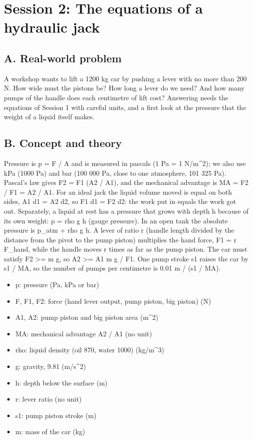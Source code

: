 \documentclass[11pt,a4paper]{article}
\begin{document}
\section{Session 2: The equations of a hydraulic jack}

\subsection*{A. Real-world problem}
A workshop wants to lift a 1200 kg car by pushing a lever with no more than 200 N. How wide must the pistons be? How long a lever do we need? And how many pumps of the handle does each centimetre of lift cost? Answering needs the equations of Session 1 with careful units, and a first look at the pressure that the weight of a liquid itself makes.

\subsection*{B. Concept and theory}
Pressure is p = F / A and is measured in pascals (1 Pa = 1 N/m\textasciicircum{}2); we also use kPa (1000 Pa) and bar (100 000 Pa, close to one atmosphere, 101 325 Pa). Pascal's law gives F2 = F1 (A2 / A1), and the mechanical advantage is MA = F2 / F1 = A2 / A1. For an ideal jack the liquid volume moved is equal on both sides, A1 d1 = A2 d2, so F1 d1 = F2 d2: the work put in equals the work got out. Separately, a liquid at rest has a pressure that grows with depth h because of its own weight: p = rho g h (gauge pressure). In an open tank the absolute pressure is p\_atm + rho g h. A lever of ratio r (handle length divided by the distance from the pivot to the pump piston) multiplies the hand force, F1 = r F\_hand, while the handle moves r times as far as the pump piston. The car must satisfy F2 \textgreater{}= m g, so A2 \textgreater{}= A1 m g / F1. One pump stroke s1 raises the car by s1 / MA, so the number of pumps per centimetre is 0.01 m / (s1 / MA).

\begin{itemize}[nosep]
\item p: pressure (Pa, kPa or bar)
\item F, F1, F2: force (hand lever output, pump piston, big piston) (N)
\item A1, A2: pump piston and big piston area (m\textasciicircum{}2)
\item MA: mechanical advantage A2 / A1 (no unit)
\item rho: liquid density (oil 870, water 1000) (kg/m\textasciicircum{}3)
\item g: gravity, 9.81 (m/s\textasciicircum{}2)
\item h: depth below the surface (m)
\item r: lever ratio (no unit)
\item s1: pump piston stroke (m)
\item m: mass of the car (kg)
\end{itemize}
\end{document}
